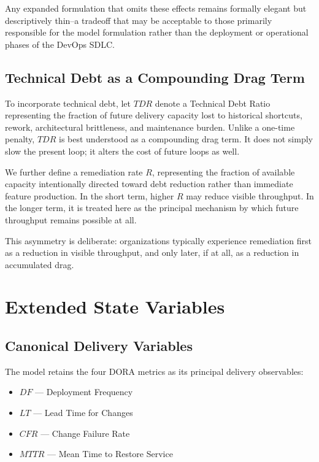 \documentclass[letterpaper]{article}
\begin{document}
Any expanded formulation that omits these effects remains formally elegant but descriptively thin--a tradeoff that may be acceptable to those primarily responsible for the model formulation rather than the deployment or operational phases of the DevOps SDLC.


\subsection{Technical Debt as a Compounding Drag Term}

To incorporate technical debt, let $TDR$ denote a Technical Debt Ratio representing the fraction of future delivery capacity lost to historical shortcuts, rework, architectural brittleness, and maintenance burden. Unlike a one-time penalty, $TDR$ is best understood as a compounding drag term. It does not simply slow the present loop; it alters the cost of future loops as well.

We further define a remediation rate $R$, representing the fraction of available capacity intentionally directed toward debt reduction rather than immediate feature production. In the short term, higher $R$ may reduce visible throughput. In the longer term, it is treated here as the principal mechanism by which future throughput remains possible at all.

This asymmetry is deliberate: organizations typically experience remediation first as a reduction in visible throughput, and only later, if at all, as a reduction in accumulated drag.

\section{Extended State Variables}

\subsection{Canonical Delivery Variables}

The model retains the four DORA metrics as its principal delivery observables:
\begin{itemize}
    \item \textbf{$DF$} --- Deployment Frequency
    \item \textbf{$LT$} --- Lead Time for Changes
    \item \textbf{$CFR$} --- Change Failure Rate
    \item \textbf{$MTTR$} --- Mean Time to Restore Service
\end{itemize}
\end{document}
